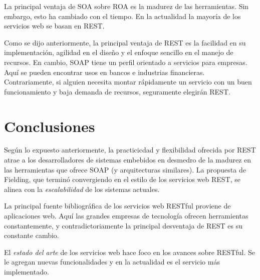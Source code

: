\documentclass[conference]{IEEEtran}
\begin{document}
La principal ventaja de SOA sobre ROA es la madurez de las
herramientas. Sin embargo, esto ha cambiado con el tiempo. En la
actualidad la mayoría de los servicios web se basan en REST.

Como se dijo anteriormente, la principal ventaja de REST es la
facilidad en su implementación, agilidad en el diseño y el enfoque
sencillo en el manejo de recursos. En cambio, SOAP tiene un perfil
orientado a servicios para empresas. Aquí se pueden encontrar usos en
bancos e industrias financieras. Contrariamente, si alguien necesita
montar rápidamente un servicio con un buen funcionamiento y baja
demanda de recursos, seguramente elegirán REST.

\section{Conclusiones}
\label{sec:con}

Según lo expuesto anteriormente, la practicicdad y flexibilidad
ofrecida por REST atrae a los desarrolladores de sistemas embebidos en
desmedro de la madurez en las herramientas que ofrece SOAP (y
arquitecturas similares). La propuesta de Fielding, que terminó
convergiendo en el estilo de los servicios web REST, se alinea con la
\emph{escalabilidad} de los sistemas actuales.

La principal fuente bibliográfica de los servicios web RESTful
proviene de aplicaciones web. Aquí las grandes empresas de
tecnología ofrecen herramientas constantemente, y contradictoriamente
la principal desventaja de REST es su constante cambio. 

El \emph{estado del arte} de los servicios web hace foco en los avances
sobre RESTful. Se le agregan nuevas funcionalidades y en la actualidad
es el servicio más implementado. 
\end{document}
